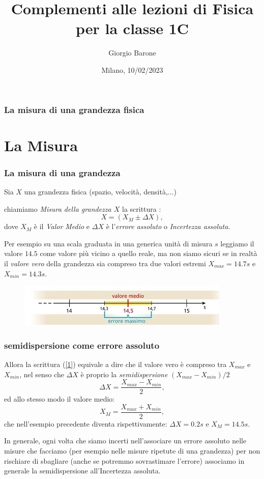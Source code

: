 \documentclass{beamer}
\title{Complementi alle lezioni di Fisica per la classe 1C}
\author{Giorgio Barone}
\date{Milano, 10/02/2023}
\institute[]{Liceo Scientifico "Alessandro Volta"}
\theoremstyle{definition}
\theoremstyle{plain}
\begin{document}
\begin{frame}
\maketitle
\end{frame}
\begin{frame}
\frametitle{La misura di una grandezza fisica}
\tableofcontents
\end{frame}

\section{La Misura}

\begin{frame}
\frametitle{La misura di una grandezza}
Sia $X$ una grandezza fisica (spazio, velocità, densità,...)

chiamiamo \emph{Misura della grandezza $X$} la scrittura : 
\begin{equation}
X = (X_M \pm \Delta X),
\label{1}
\end{equation}
dove $X_M$ è il \emph{Valor Medio} e $\Delta X$ è l'\emph{errore assoluto} o \emph{Incertezza assoluta}.

Per esempio su una scala graduata in una generica unità di misura $s$ leggiamo il valore $14.5$ come valore più vicino a quello reale, ma non siamo sicuri se in realtà il \emph{valore vero} della grandezza sia compreso tra due valori estremi $X_{max} = 14.7 s$ e $X_{min} = 14.3 s$.
\begin{figure}
  \includegraphics[width=0.8\columnwidth]{errore_assoluto1.jpg}
\end{figure}

\end{frame}

\begin{frame}
\frametitle{semidispersione come errore assoluto}
Allora la scrittura (\ref{1}) equivale a dire che il valore vero è compreso tra $X_{max}$ e $X_{min}$, nel senso che $\Delta X$ è proprio la \emph{semidispersione} $(X_{max} - X_{min})/2$ 
\begin{equation}
\Delta X = \frac{X_{max} - X_{min}}{2},
\label{2}
\end{equation}
ed allo stesso modo il valore medio:
\begin{equation}
X_M = \frac{X_{max} + X_{min}}{2},
\label{3}
\end{equation}
che nell'esempio precedente diventa rispettivamente:
$\Delta X = 0.2 s$ e $X_M = 14.5s$.

In generale, ogni volta che siamo incerti nell'associare un errore assoluto nelle misure che facciamo (per esempio nelle misure ripetute di una grandezza) per non rischiare di sbagliare (anche se potremmo sovrastimare l'errore) associamo in generale la semidispersione all'Incertezza assoluta.

\end{frame}
\end{document}

